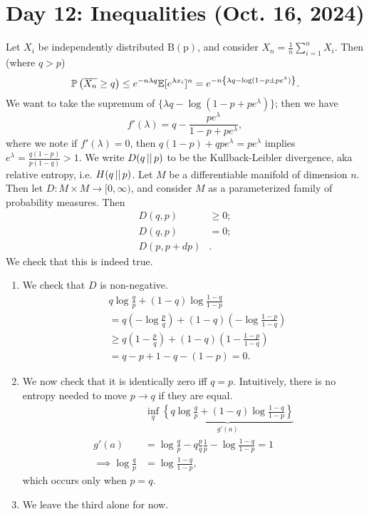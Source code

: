 \section{Day 12: Inequalities (Oct. 16, 2024)}
Let $X_i$ be independently distributed $\mathrm{B(p)}$, and consider $X_n = \frac{1}{n} \sum_{i=1}^n X_i$. Then (where $q > p$)
\[ \mathbb P\left(\overline{X_n} \geq q\right) \leq e^{-n \lambda q} \mathbb E[e^{\lambda x_i}]^n = e^{-n \left\{\lambda q - \log(1 - p \pm pe^{\lambda})\right\}}. \]
We want to take the supremum of $\{\lambda q - \log (1 - p + pe^\lambda)\}$; then we have
\[ f'(\lambda) = q - \frac{pe^{\lambda}}{1 - p + pe^\lambda}, \]
where we note if $f'(\lambda) = 0$, then $q(1 - p) + qpe^\lambda = pe^\lambda$ implies $e^\lambda = \frac{q(1 - p)}{p(1 - q)} > 1$. We write $D(q \left\lvert  \right\rvert p)$ to be the Kullback-Leibler divergence, aka relative entropy, i.e. $H(q \left\lvert  \right\rvert p)$. Let $M$ be a differentiable manifold of dimension $n$. Then let $D : M \times M \to [0, \infty)$, and consider $M$ as a parameterized family of probability measures. Then
\begin{align*}
    D(q, p) &\geq 0; \\
    D(q, p) &= 0; \tag{if and only if $q = p$} \\
    D(p, p + dp) & \tag{should be positive def. quadratic in $dp$}.
\end{align*}
We check that this is indeed true.
\begin{enumerate}[label=(\alph*)]
    \item We check that $D$ is non-negative.
    \begin{align*}
        & q \log \frac{q}{p} + (1 - q) \log \frac{1 - q}{1 - p} \\
        &= q \left(- \log \frac{p}{q}\right) + (1 - q)\left(- \log \frac{1 - p}{1 - q}\right) \\
        &\geq q\left(1 - \frac{p}{q}\right) + (1 - q)\left(1 - \frac{1 - p}{1 - q}\right) \\
        &= q - p + 1-q - (1 - p) = 0.
    \end{align*}
    \item We now check that it is identically zero iff $q = p$. Intuitively, there is no entropy needed to move $p \to q$ if they are equal.
    \begin{align*}
        & \inf_q \underbrace{\left\{ q \log \frac{q}{p} + (1 - q)\log \frac{1-q}{1-p} \right\}}_{g'(a)} \\
        g'(a) &= \log \frac{q}{p} - q \frac{p}{q} \frac{1}{p} - \log \frac{1-q}{1-p} = 1 \\
        \implies \log \frac{q}{p} &= \log \frac{1-q}{1-p},
    \end{align*}
    which occurs only when $p = q$.
    \item We leave the third alone for now.
\end{enumerate}
